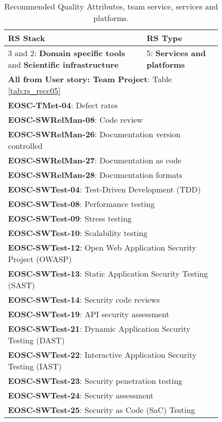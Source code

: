 \begin{table}[h]
\begin{tabular}{|p{0.55\linewidth}|p{0.3\linewidth}|}
    \textbf{RS Stack} & \textbf{RS Type} \\ \hline  \hline
    3 and 2: \textbf{Domain specific tools} and \textbf{Scientific infrastructure} & 5: \textbf{Services and platforms} \\ \hline
    \multicolumn{2}{|l|}{\textbf{All from User story: Team Project}: Table \ref{tab:rs_recc05}} \\ \hline
    \multicolumn{2}{|l|}{\textbf{EOSC-TMet-04}: Defect rates} \\ \hline
    \multicolumn{2}{|l|}{\textbf{EOSC-SWRelMan-08}: Code review} \\ \hline
    \multicolumn{2}{|l|}{\textbf{EOSC-SWRelMan-26}: Documentation version controlled} \\ \hline
    \multicolumn{2}{|l|}{\textbf{EOSC-SWRelMan-27}: Documentation as code} \\ \hline
    \multicolumn{2}{|l|}{\textbf{EOSC-SWRelMan-28}: Documentation formats} \\ \hline
    \multicolumn{2}{|l|}{\textbf{EOSC-SWTest-04}: Test-Driven Development (TDD)} \\ \hline
    \multicolumn{2}{|l|}{\textbf{EOSC-SWTest-08}: Performance testing} \\ \hline
    \multicolumn{2}{|l|}{\textbf{EOSC-SWTest-09}: Stress testing} \\ \hline
    \multicolumn{2}{|l|}{\textbf{EOSC-SWTest-10}: Scalability testing} \\ \hline
    \multicolumn{2}{|l|}{\textbf{EOSC-SWTest-12}: Open Web Application Security Project (OWASP)} \\ \hline
    \multicolumn{2}{|l|}{\textbf{EOSC-SWTest-13}: Static Application Security Testing (SAST)} \\ \hline
    \multicolumn{2}{|l|}{\textbf{EOSC-SWTest-14}: Security code reviews} \\ \hline
    \multicolumn{2}{|l|}{\textbf{EOSC-SWTest-19}: API security assessment} \\ \hline
    \multicolumn{2}{|l|}{\textbf{EOSC-SWTest-21}: Dynamic Application Security Testing (DAST)} \\ \hline
    \multicolumn{2}{|l|}{\textbf{EOSC-SWTest-22}: Interactive Application Security Testing (IAST)} \\ \hline
    \multicolumn{2}{|l|}{\textbf{EOSC-SWTest-23}: Security penetration testing} \\ \hline
    \multicolumn{2}{|l|}{\textbf{EOSC-SWTest-24}: Security assessment} \\ \hline
    \multicolumn{2}{|l|}{\textbf{EOSC-SWTest-25}: Security as Code (SaC) Testing} \\ \hline

  \end{tabular}
  \caption{Recommended Quality Attributes, team service, services and platforms.}
  \label{tab:rs_recc08}
\end{table}

